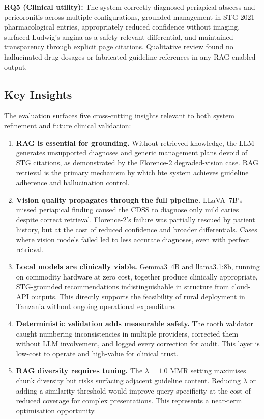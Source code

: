 \documentclass[12pt,a4paper]{report}
\begin{document}
\textbf{RQ5 (Clinical utility):} The system correctly diagnosed periapical
abscess and pericoronitis across multiple configurations, grounded management
in STG-2021 pharmacological entries, appropriately reduced confidence without
imaging, surfaced Ludwig's angina as a safety-relevant differential, and
maintained transparency through explicit page citations. Qualitative review found
no hallucinated drug dosages or fabricated guideline references in any RAG-enabled
output.

\subsection{Key Insights}

The evaluation surfaces five cross-cutting insights relevant to both system
refinement and future clinical validation:

\begin{enumerate}

\item \textbf{RAG is essential for grounding.} Without retrieved knowledge, the
LLM generates unsupported diagnoses and generic management plans devoid of STG
citations, as demonstrated by the Florence-2 degraded-vision case. RAG retrieval
is the primary mechanism by which hte system achieves guideline adherence and
hallucination control.

\item \textbf{Vision quality propagates through the full pipeline.} LLaVA~7B's
missed periapical finding caused the CDSS to diagnose only mild caries despite
correct retrieval. Florence-2's failure was partially rescued by patient history,
but at the cost of reduced confidence and broader differentials. Cases where vision models failed led to less accurate diagnoses, even with perfect retrieval.

\item \textbf{Local models are clinically viable.} Gemma3~4B and llama3.1:8b,
running on commodity hardware at zero cost, together produce clinically
appropriate, STG-grounded recommendations indistinguishable in structure from
cloud-API outputs. This directly supports the feasibility of rural deployment
in Tanzania without ongoing operational expenditure.

\item \textbf{Deterministic validation adds measurable safety.} The tooth
validator caught numbering inconsistencies in multiple providers, corrected
them without LLM involvement, and logged every correction for audit.
This layer is low-cost to operate and high-value for clinical trust.

\item \textbf{RAG diversity requires tuning.} The $\lambda{=}1.0$ MMR setting
maximises chunk diversity but risks surfacing adjacent guideline content.
Reducing $\lambda$ or adding a similarity threshold would improve query
specificity at the cost of reduced coverage for complex presentations.
This represents a near-term optimisation opportunity.

\end{enumerate}
\end{document}
